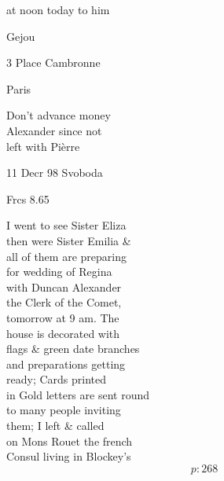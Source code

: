 \documentclass{report}
\begin{document}



	\par{
 	at noon today to him\ \\
	}

	\par{
 	Gejou\ \\
	}

	\par{
 	3 Place Cambronne\ \\
	}

	\par{
 	Paris\ \\
	}

	\par{
 	Don’t advance money\ \\Alexander since not\ \\left with Pièrre\ \\
	}

	\par{
 	11 Decr 98 Svoboda\ \\
	}

	\par{
 	Frcs 8.65\ \\
	}

	\par{
 	I went to see Sister Eliza\ \\then were Sister Emilia \&\ \\all of them are preparing\ \\for wedding of Regina\ \\with Duncan Alexander\ \\the Clerk of the Comet,\ \\tomorrow at 9 am. The\ \\house is decorated with\ \\flags \& green date branches\ \\and preparations getting\ \\ready; Cards printed\ \\in Gold letters are sent round\ \\to many people inviting\ \\them; I left \& called\ \\on Mons Rouet the french\ \\Consul living in Blockey’s\ \\
  \[p: 268 \]

	}
\end{document}
